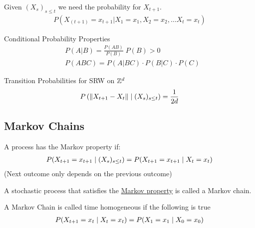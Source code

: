 \documentclass[12pt,a4paper]{article}
\begin{document}
\begin{defn}
Given $(X_s)_{s \leq t}$ we need the probability for $X_{t+1}$.
\begin{align*}
P(X_{(t+1)} = x_{t+1} \vert X_1 = x_1 , X_2 = x_2, \ldots X_t = x_t)
\end{align*}
\end{defn}


\begin{note}{Conditional Probability Properties}
\begin{align*}
&P(A | B) = \frac{P(AB)}{P(B)} \; P(B) > 0\\
&P(ABC) = P(A|BC) \cdot P(B|C) \cdot P(C)
\end{align*}
\end{note}

\begin{example}{Transition Probabilities for SRW on $\mathbb{Z}^d$}
\begin{align*}
P\left(\norm{X_{t+1} - X_{t}} \;\vert\; (X_{s})_{s \leq t} \right) = \frac{1}{2d} 
\end{align*}
\end{example}
\newpage
\subsection{Markov Chains}
\begin{defn}
\label{markovprop}
A process has the Markov property if:
\begin{align*}
P(X_{t+1}= x_{t+1} \;\vert\; (X_{s})_{s\leq t}) = P(X_{t+1} = x_{t+1} \;\vert\; X_{t} = x_t)
\end{align*}
(Next outcome only depends on the previous outcome)
\end{defn}

\begin{note}
A stochastic process that satisfies the \hyperref[markovprop]{Markov property} is called a Markov chain.
\end{note}

\begin{defn}
A Markov Chain is called time homogeneous if the following is true
\begin{align*}
P(X_{t+1} = x_t \;\vert\; X_t = x_t) = P(X_1 = x_1 \;\vert\; X_0 = x_0)
\end{align*}
\end{defn}
\end{document}
